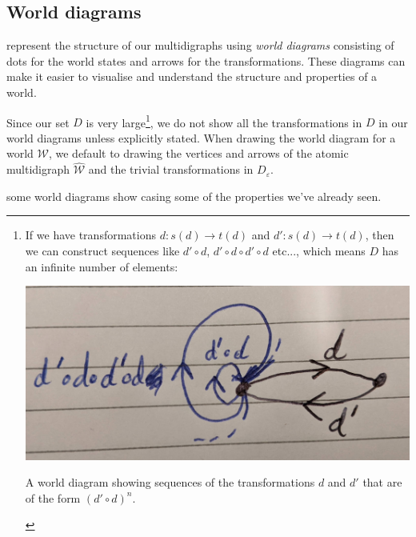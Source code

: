 \subsection{World diagrams}

 represent the structure of our multidigraphs using \emph{world diagrams} consisting of dots for the world states and arrows for the transformations.
These diagrams can make it easier to visualise and understand the structure and properties of a world.

Since our set $D$ is very large\footnote{
	If we have transformations $d: s(d) \to t(d)$ and $d': s(d) \to t(d)$, then we can construct sequences like $d' \circ d$, $d' \circ d \circ d' \circ d$ etc..., which means $D$ has an infinite number of elements:
	\begin{center}
		\FloatBarrier
		\captionsetup{type=figure}
		\includegraphics[width=1.0\linewidth]{2MathematicalFramework/Images/D_commonly_large.jpg}
		\caption{A world diagram showing sequences of the transformations $d$ and $d'$ that are of the form $(d' \circ d)^{n}$.}
	\end{center}
}, we do not show all the transformations in $D$ in our world diagrams unless explicitly stated.
When drawing the world diagram for a world $\mathscr{W}$, we default to drawing the vertices and arrows of the atomic multidigraph $\hat{\mathscr{W}}$ and the trivial transformations in $D_{\varepsilon}$.

 some world diagrams show casing some of the properties we've already seen.

